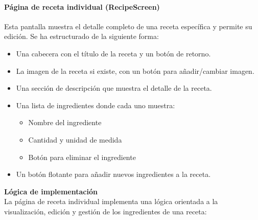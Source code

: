 \documentclass[twoside, openright, 11pt]{report}
\begin{document}
				
				\paragraph{Página de receta individual (RecipeScreen)\\}
				Esta pantalla muestra el detalle completo de una receta específica y permite su edición. Se ha estructurado de la siguiente forma:
				
				\begin{itemize}
					\item Una cabecera con el título de la receta y un botón de retorno.
					\item La imagen de la receta si existe, con un botón para añadir/cambiar imagen.
					\item Una sección de descripción que muestra el detalle de la receta.
					\item Una lista de ingredientes donde cada uno muestra:
					\begin{itemize}
						\item Nombre del ingrediente
						\item Cantidad y unidad de medida
						\item Botón para eliminar el ingrediente
					\end{itemize}
					\item Un botón flotante para añadir nuevos ingredientes a la receta.
				\end{itemize}
				
				\textbf{Lógica de implementación}\\
				La página de receta individual implementa una lógica orientada a la visualización, edición y gestión de los ingredientes de una receta:
				
\end{document}
